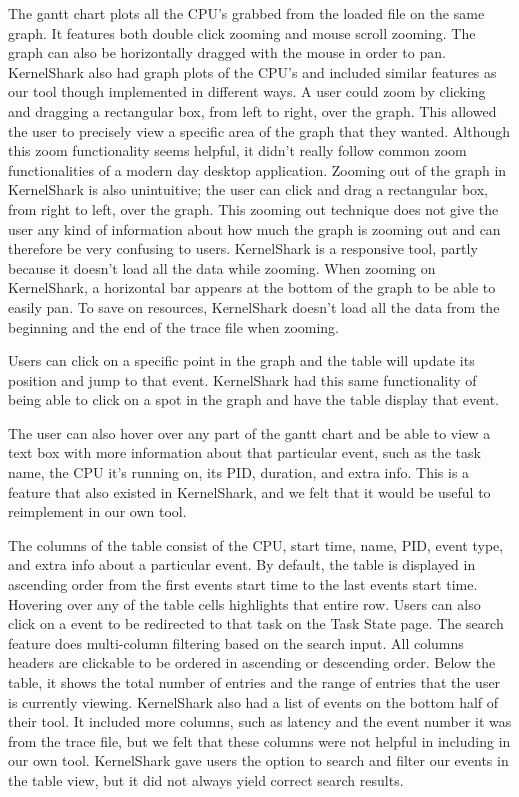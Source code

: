 \documentclass{hmcclinic}
\begin{document}
    The gantt chart plots all the CPU's grabbed from the loaded file on the same
    graph. It features both double click zooming and mouse scroll zooming. The
    graph can also be horizontally dragged with the mouse in order to pan.  KernelShark also had graph plots of the CPU's and included similar features as our tool though implemented in different ways. A user could zoom by clicking and dragging a rectangular box, from left to right, over the graph. This allowed the user to precisely view a specific area of the graph that they wanted. Although this zoom functionality seems helpful, it didn't really follow common zoom functionalities of a modern day desktop application. Zooming out of the graph in KernelShark is also unintuitive; the user can click and drag a rectangular box, from right to left, over the graph. This zooming out technique does not give the user any kind of information about how much the graph is zooming out and can therefore be very confusing to users. KernelShark is a responsive tool, partly because it doesn't load all the data while zooming. When zooming on KernelShark, a horizontal bar appears at the bottom of the graph to be able to easily pan. To save on resources, KernelShark doesn't load all the data from the beginning and the end of the trace file when zooming. 
    
    Users can click on a specific point in the graph and the table will update its position and jump to that event. KernelShark had this same functionality of being able to click on a spot in the graph and have the table display that event. %
    
    The user can also hover over any part of the gantt chart and be able to view a text box with more information about that particular event, such as the task name, the CPU it's running on, its PID, duration, and extra info. This is a feature that also existed in KernelShark, and we felt that it would be useful to reimplement in our own tool.

    The columns of the table consist of the CPU, start time, name, PID, event type, and extra info about a particular event. By default, the table is displayed in ascending order from the first events start time to the last events start time. Hovering over any of the table cells highlights that entire row. Users can also click on a event to be redirected to that task on the Task State page. The search feature does multi-column filtering based on the search input. All columns headers are clickable to be ordered in ascending or descending order. Below the table, it shows the total number of entries and the range of entries that the user is currently viewing. KernelShark also had a list of events on the bottom half of their tool. It included more columns, such as latency and the event number it was from the trace file, but we felt that these columns were not helpful in including in our own tool. KernelShark gave users the option to search and filter our events in the table view, but it did not always yield correct search results. 
    
\end{document}
